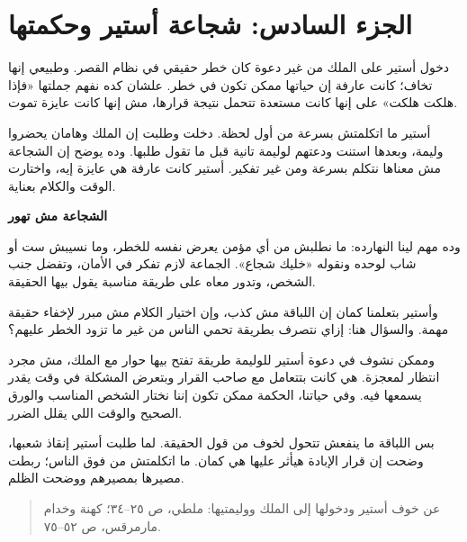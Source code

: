 \documentclass[12pt,a4paper]{article}
\begin{document}
\section*{الجزء السادس: شجاعة أستير وحكمتها}
دخول أستير على الملك من غير دعوة كان خطر حقيقي في نظام القصر. وطبيعي إنها تخاف؛ كانت عارفة إن حياتها ممكن تكون في خطر. علشان كده نفهم جملتها «فإذا هلكت هلكت» على إنها كانت مستعدة تتحمل نتيجة قرارها، مش إنها كانت عايزة تموت.\par\medskip
أستير ما اتكلمتش بسرعة من أول لحظة. دخلت وطلبت إن الملك وهامان يحضروا وليمة، وبعدها استنت ودعتهم لوليمة تانية قبل ما تقول طلبها. وده يوضح إن الشجاعة مش معناها نتكلم بسرعة ومن غير تفكير. أستير كانت عارفة هي عايزة إيه، واختارت الوقت والكلام بعناية.\par\medskip
\vspace{0.2em}\noindent\textcolor{ochre}{\textbf{الشجاعة مش تهور}}\par\smallskip
وده مهم لينا النهارده: ما نطلبش من أي مؤمن يعرض نفسه للخطر، وما نسيبش ست أو شاب لوحده ونقوله «خليك شجاع». الجماعة لازم تفكر في الأمان، وتفضل جنب الشخص، وتدور معاه على طريقة مناسبة يقول بيها الحقيقة.\par\medskip
وأستير بتعلمنا كمان إن اللباقة مش كذب، وإن اختيار الكلام مش مبرر لإخفاء حقيقة مهمة. والسؤال هنا: إزاي نتصرف بطريقة تحمي الناس من غير ما تزود الخطر عليهم؟\par\medskip
وممكن نشوف في دعوة أستير للوليمة طريقة تفتح بيها حوار مع الملك، مش مجرد انتظار لمعجزة. هي كانت بتتعامل مع صاحب القرار وبتعرض المشكلة في وقت يقدر يسمعها فيه. وفي حياتنا، الحكمة ممكن تكون إننا نختار الشخص المناسب والورق الصحيح والوقت اللي يقلل الضرر.\par\medskip
بس اللباقة ما ينفعش تتحول لخوف من قول الحقيقة. لما طلبت أستير إنقاذ شعبها، وضحت إن قرار الإبادة هيأثر عليها هي كمان. ما اتكلمتش من فوق الناس؛ ربطت مصيرها بمصيرهم ووضحت الظلم.\par\medskip
\begin{quote}\small\color{muted}عن خوف أستير ودخولها إلى الملك ووليمتيها: ملطي، ص ٢٥–٣٤؛ كهنة وخدام مارمرقس، ص ٥٢–٧٥.\end{quote}
\clearpage
\clearpage
\end{document}
